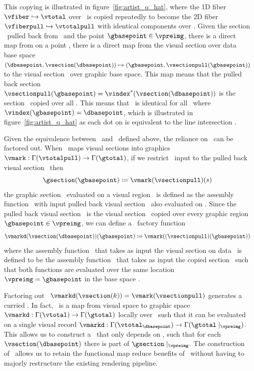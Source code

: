 \documentclass[../main.tex]{subfiles}
\begin{document}
This copying is illustrated in figure~\ref{fig:artist_q_hat}, where the 1D fiber $\vfiber \hookrightarrow \vtotal$ over \dbase\ is copied repeatedly to become the 2D fiber $\vfiberpull \hookrightarrow \vtotalpull$ with identical components over \gbase. Given the section \vsectionpull\ pulled back from \vsection\ and the point $\gbasepoint \in \vpreimg$, there is a direct map from \vsection on a point \dbasepoint, there is a direct map from the visual section over data base space  $(\dbasepoint, \vsection(\dbasepoint)) \mapsto (\gbasepoint, \vsectionpull(\gbasepoint))$ to the visual section \vsectionpull\ over graphic base space. This map means that the pulled back section $\vsectionpull(\gbasepoint) = \vindex^*(\vsection(\dbasepoint))$ is the section \vsection\ copied over all \gbasepoint. This means that \vsectionpull\ is identical for all \gbasepoint\ where $\vindex(\gbasepoint) = \dbasepoint$, which is illustrated in figure~\ref{fig:artist_q_hat} as each dot on \vfiber is equivalent to the line intersection \vfiberpull. 

Given the equivalence between \vsection\ and \vsectionpull\ defined above, the reliance on \gbase\ can be factored out. When \vmark\ maps visual sections  into graphics $\vmark: \Gamma(\vtotalpull) \rightarrow \Gamma(\gtotal)$, if we restrict \vmark\ input to the pulled back visual section \vsectionpull\ then 
\begin{equation}
    \gsection(\gbasepoint) \coloneqq \vmark(\vsectionpull)(s)
\end{equation}
the graphic section \gsection\ evaluated on a visual region \gbasepoint\ is defined as the assembly function \vmark\ with input pulled back visual section \vsectionpull\ also evaluated on \gbasepoint. Since the pulled back visual section \vsectionpull\ is the visual section \vsection\ copied over every graphic region $\gbasepoint \in \vpreimg$, we can define a \vmark\ factory function 
\begin{equation}
\vmarkd(\vsection(\dbasepoint))(\gbasepoint) \coloneqq \vmark((\vsectionpull)(\gbasepoint))
\end{equation} 
where the assembly function \vmarkd\ that takes as input the visual section on data \vsection\ is defined to be the assembly function \vmark\ that takes as input the copied section \vsectionpull\ such that both functions are evaluated over the same location $\vpreimg = \gbasepoint$ in the base space \gbase. 

Factoring out \gbasepoint\, $\vmarkd(\vsection(k)) = \vmark(\vsectionpull)$ generates a curried \vmark. In fact, \vmarkd\ is a map from visual space to graphic space $\vmarkd:\Gamma(\vtotal) \rightarrow \Gamma(\gtotal)$ locally over \dbasepoint\ such that it can be evaluated on a single visual record   $\vmarkd:\Gamma(\vtotal_{\dbasepoint}) \rightarrow \Gamma(\gtotal\mid_{\vpreimg})$. This allows us to construct a \vmarkd\ that only depends on \dbase, such that for each $\vsection(\dbasepoint)$ there is part of $\gsection\mid_{\vpreimg}$. The construction of \vmarkd\ allows us to retain the functional map reduce benefits of \vmark\ without having to majorly restructure the existing rendering pipeline.
\end{document}
